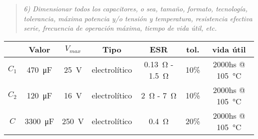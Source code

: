 \begin{quote} \textit{6) Dimensionar todos los capacitores, o sea, tamaño, formato, tecnología, tolerancia, máxima potencia y/o tensión y temperatura, resistencia efectiva serie, frecuencia de operación máxima, tiempo de vida útil, etc.}
\end{quote}
\begin{table}[H]
	\centering
	\begin{tabular}{ccccccc}
		\toprule
		& Valor & $V_{max}$ & Tipo & ESR & tol. & vida útil \\
		\midrule
		$C_1$ & \SI{470}{\micro\farad} & \SI{25}{\volt} & electrolítico & \SI{0.13}{\ohm} - \SI{1.5}{\ohm} & 10\% & 2000hs @ \SI{105}{\celsius} \\
		$C_2$ &\SI{120}{\micro\farad} & \SI{16}{\volt} & electrolítico & \SI{2}{\ohm} - \SI{7}{\ohm}& 10\% & 2000hs @ \SI{105}{\celsius} \\
		$C$ &\SI{3300}{\micro\farad} & \SI{250}{\volt} & electrolítico & \SI{0.4}{\ohm} & 20\% &  2000hs @ \SI{105}{\celsius} \\
		\bottomrule
	\end{tabular}
\end{table}

